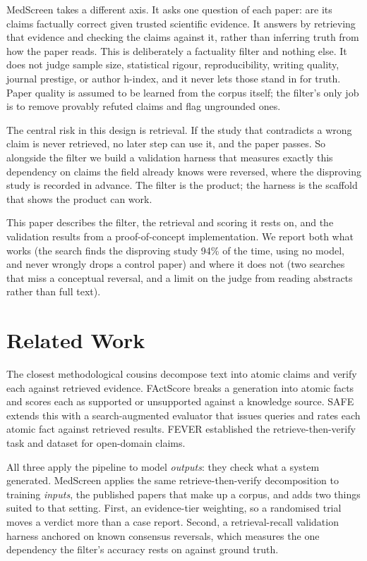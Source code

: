 \documentclass[11pt,a4paper]{article}
\begin{document}
MedScreen takes a different axis. It asks one question of each paper: are its claims factually correct given trusted scientific evidence. It answers by retrieving that evidence and checking the claims against it, rather than inferring truth from how the paper reads. This is deliberately a factuality filter and nothing else. It does not judge sample size, statistical rigour, reproducibility, writing quality, journal prestige, or author h-index, and it never lets those stand in for truth. Paper quality is assumed to be learned from the corpus itself; the filter's only job is to remove provably refuted claims and flag ungrounded ones.

The central risk in this design is retrieval. If the study that contradicts a wrong claim is never retrieved, no later step can use it, and the paper passes. So alongside the filter we build a validation harness that measures exactly this dependency on claims the field already knows were reversed, where the disproving study is recorded in advance. The filter is the product; the harness is the scaffold that shows the product can work.

This paper describes the filter, the retrieval and scoring it rests on, and the validation results from a proof-of-concept implementation. We report both what works (the search finds the disproving study 94\% of the time, using no model, and never wrongly drops a control paper) and where it does not (two searches that miss a conceptual reversal, and a limit on the judge from reading abstracts rather than full text).

\section{Related Work}

The closest methodological cousins decompose text into atomic claims and verify each against retrieved evidence. FActScore \citep{factscore2023} breaks a generation into atomic facts and scores each as supported or unsupported against a knowledge source. SAFE \citep{safe2024} extends this with a search-augmented evaluator that issues queries and rates each atomic fact against retrieved results. FEVER \citep{fever2018} established the retrieve-then-verify task and dataset for open-domain claims.

All three apply the pipeline to model \emph{outputs}: they check what a system generated. MedScreen applies the same retrieve-then-verify decomposition to training \emph{inputs}, the published papers that make up a corpus, and adds two things suited to that setting. First, an evidence-tier weighting, so a randomised trial moves a verdict more than a case report. Second, a retrieval-recall validation harness anchored on known consensus reversals, which measures the one dependency the filter's accuracy rests on against ground truth.
\end{document}
